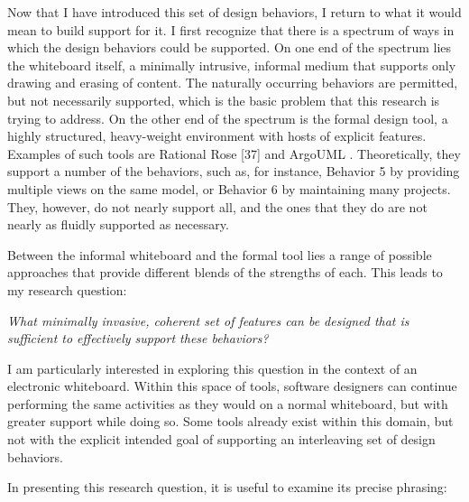 Now that I have introduced this set of design behaviors, I return to what it would mean to build support for it. I first recognize that there is a spectrum of ways in which the design behaviors could be supported. On one end of the spectrum lies the whiteboard itself, a minimally intrusive, informal medium that supports only drawing and erasing of content. The naturally occurring behaviors are permitted, but not necessarily supported, which is the basic problem that this research is trying to address. On the other end of the spectrum is the formal design tool, a highly structured, heavy-weight environment with hosts of explicit features. Examples of such tools are Rational Rose [37] and ArgoUML \cite{robbins2000cognitive}. Theoretically, they support a number of the behaviors, such as, for instance, Behavior 5 by providing multiple views on the same model, or Behavior 6 by maintaining many projects. They, however, do not nearly support all, and the ones that they do are not nearly as fluidly supported as necessary. 

Between the informal whiteboard and the formal tool lies a range of possible approaches that provide different blends of the strengths of each. This leads to my research question:

    \newenvironment{myindentpar}[1]%
     {\begin{list}{}%
             {\setlength{\leftmargin}{#1}}%
             \item[]%
     }
     {\end{list}}

\begin{myindentpar}{1cm}
\emph{What minimally invasive, coherent set of features can be designed that is sufficient to effectively support these behaviors?}
\end{myindentpar}

I am particularly interested in exploring this question in the context of an electronic whiteboard. Within this space of tools, software designers can continue performing the same activities as they would on a normal whiteboard, but with greater support while doing so. Some tools already exist within this domain, but not with the explicit intended goal of supporting an interleaving set of design behaviors.

In presenting this research question, it is useful to examine its precise phrasing:

